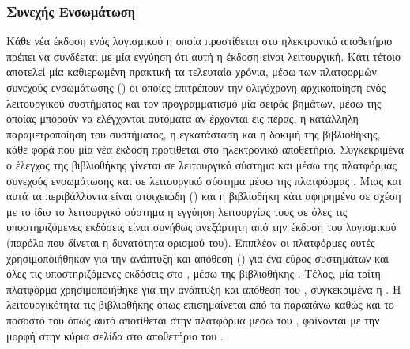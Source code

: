 \subsubsection{Συνεχής Ενσωμάτωση}
Κάθε νέα έκδοση ενός λογισμικού η οποία προστίθεται στο ηλεκτρονικό αποθετήριο \texttt{} πρέπει να συνδέεται με μία εγγύηση ότι αυτή η έκδοση είναι λειτουργική.
Κάτι τέτοιο αποτελεί μία καθιερωμένη πρακτική τα τελευταία χρόνια, μέσω των πλατφορμών συνεχούς ενσωμάτωσης () οι οποίες επιτρέπουν την ολιγόχρονη αρχικοποίηση ενός λειτουργικού συστήματος και τον προγραμματισμό μία σειράς βημάτων, μέσω της οποίας μπορούν να ελέγχονται αυτόματα αν έρχονται εις πέρας, η κατάλληλη παραμετροποίηση του συστήματος, η εγκατάσταση και η δοκιμή της βιβλιοθήκης, κάθε φορά που μία νέα έκδοση προτίθεται στο ηλεκτρονικό αποθετήριο.
Συγκεκριμένα ο έλεγχος της βιβλιοθήκης  γίνεται σε λειτουργικό σύστημα  και  μέσω της πλατφόρμας συνεχούς ενσωμάτωσης \href{https://travis-ci.org/ysig/GraKeL}{} και σε λειτουργικό σύστημα  μέσω της πλατφόρμας \href{https://ci.appveyor.com/project/ysig/grakel}{}.
Μιας και αυτά τα περιβάλλοντα είναι στοιχειώδη () και η βιβλιοθήκη κάτι αφηρημένο σε σχέση με το ίδιο το λειτουργικό σύστημα η εγγύηση λειτουργίας τους σε όλες τις υποστηριζόμενες εκδόσεις  είναι συνήθως ανεξάρτητη από την έκδοση του λογισμικού (παρόλο που δίνεται η δυνατότητα ορισμού του).
Επιπλέον οι πλατφόρμες αυτές χρησιμοποιήθηκαν για την ανάπτυξη και απόθεση ()  για ένα εύρος συστημάτων και όλες τις υποστηριζόμενες εκδόσεις  στο , μέσω της βιβλιοθήκης \href{https://github.com/joerick/cibuildwheel}{}.
Τέλος, μία τρίτη πλατφόρμα χρησιμοποιήθηκε για την ανάπτυξη και απόθεση του , συγκεκριμένα η \href{https://circleci.com/gh/ysig/GraKeL/tree/develop}{}.
Η λειτουργικότητα τις βιβλιοθήκης όπως επισημαίνεται από τα παραπάνω καθώς και το ποσοστό του  όπως αυτό αποτίθεται στην πλατφόρμα \href{https://coveralls.io/github/ysig/GraKeL}{} μέσω του , φαίνονται με την μορφή  στην κύρια σελίδα στο αποθετήριο του \href{https://github.com/ysig/GraKeL}{}.

